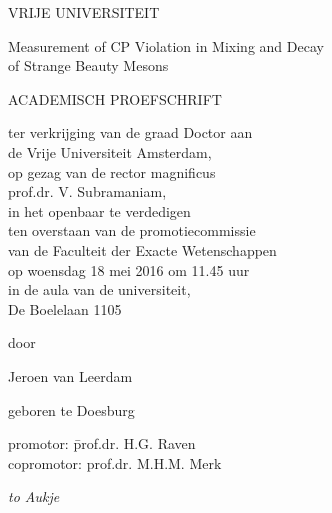 \begin{center}


VRIJE UNIVERSITEIT


{\Large
Measurement of CP Violation in Mixing and Decay\\
of Strange Beauty Mesons}


ACADEMISCH PROEFSCHRIFT


ter verkrijging van de graad Doctor aan\\
de Vrije Universiteit Amsterdam,\\
op gezag van de rector magnificus\\
prof.dr. V. Subramaniam,\\
in het openbaar te verdedigen\\
ten overstaan van de promotiecommissie\\
van de Faculteit der Exacte Wetenschappen\\
op woensdag 18 mei 2016 om 11.45 uur\\
in de aula van de universiteit,\\
De Boelelaan 1105


door


Jeroen van Leerdam


geboren te Doesburg


\end{center}

\newpage
\thispagestyle{empty}

\begin{tabbing}
  promotor:    \hspace{30pt}\=  prof.dr. H.G. Raven  \\
  copromotor:               \>  prof.dr. M.H.M. Merk
\end{tabbing}

\newpage
\thispagestyle{empty}


\begin{center}
  \large
  \emph{to Aukje}
\end{center}


\newpage
\thispagestyle{empty}

\cleardoublepage
